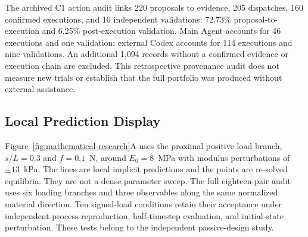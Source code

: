 The archived C1 action audit links 220 proposals to evidence, 205 dispatches, 160 confirmed executions, and 10 independent validations: 72.73\% proposal-to-execution and 6.25\% post-execution validation. Main Agent accounts for 46 executions and one validation; external Codex accounts for 114 executions and nine validations. An additional 1,094 records without a confirmed evidence or execution chain are excluded. This retrospective provenance audit does not measure new trials or establish that the full portfolio was produced without external assistance.

\subsection{Local Prediction Display}
Figure~\ref{fig:mathematical-research}A uses the proximal positive-load branch, $s/L=0.3$ and $f=0.1$~N, around $E_0=8$~MPa with modulus perturbations of $\pm13$~kPa. The lines are local implicit predictions and the points are re-solved equilibria. They are not a dense parameter sweep. The full eighteen-pair audit uses six loading branches and three observables along the same normalized material direction. Ten signed-load conditions retain their acceptance under independent-process reproduction, half-timestep evaluation, and initial-state perturbation. These tests belong to the independent passive-design study.

